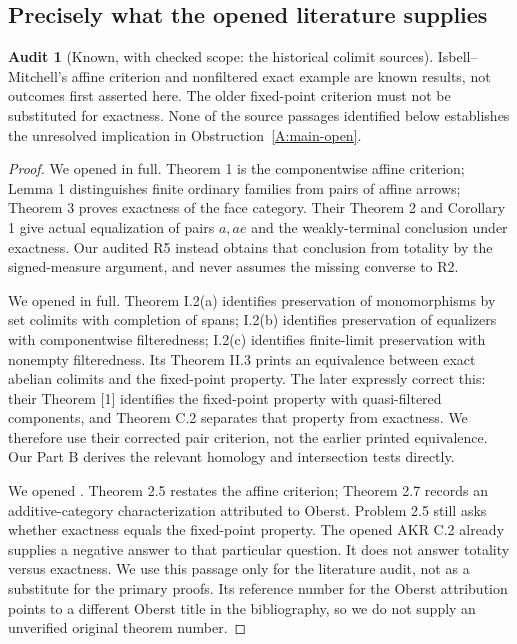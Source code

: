 \documentclass[11pt,a4paper]{article}
\theoremstyle{definition}
\newtheorem{audit}[theorem]{Audit}
\begin{document}
\subsection{Precisely what the opened literature supplies}
\begin{audit}[Known, with checked scope: the historical colimit sources]\label{F:historical}
Isbell--Mitchell's affine criterion and nonfiltered exact example are known results, not outcomes first asserted here. The older fixed-point criterion must not be substituted for exactness. None of the source passages identified below establishes the unresolved implication in Obstruction~\ref{A:main-open}.
\end{audit}
\begin{proof}
We opened \citet{IsbellMitchell1973} in full. Theorem 1 is the componentwise affine criterion; Lemma 1 distinguishes finite ordinary families from pairs of affine arrows; Theorem 3 proves exactness of the face category. Their Theorem 2 and Corollary 1 give actual equalization of pairs $a,ae$ and the weakly-terminal conclusion under exactness. Our audited R5 instead obtains that conclusion from totality by the signed-measure argument, and never assumes the missing converse to R2.

We opened \citet{AdamekReiterman1976} in full. Theorem I.2(a) identifies preservation of monomorphisms by set colimits with completion of spans; I.2(b) identifies preservation of equalizers with componentwise filteredness; I.2(c) identifies finite-limit preservation with nonempty filteredness. Its Theorem II.3 prints an equivalence between exact abelian colimits and the fixed-point property. The later \citet[Remark A.4, p.~370]{AdamekKoubekReiterman1981} expressly correct this: their Theorem [1] identifies the fixed-point property with quasi-filtered components, and Theorem C.2 separates that property from exactness. We therefore use their corrected pair criterion, not the earlier printed equivalence. Our Part B derives the relevant homology and intersection tests directly.

We opened \citet[Section 2.3]{Husainov2002}. Theorem 2.5 restates the affine criterion; Theorem 2.7 records an additive-category characterization attributed to Oberst. Problem 2.5 still asks whether exactness equals the fixed-point property. The opened AKR C.2 already supplies a negative answer to that particular question. It does not answer totality versus exactness. We use this passage only for the literature audit, not as a substitute for the primary proofs. Its reference number for the Oberst attribution points to a different Oberst title in the bibliography, so we do not supply an unverified original theorem number.
\end{proof}
\end{document}

